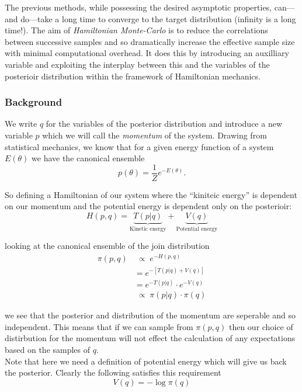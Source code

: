 \documentclass{report}
\begin{document}
The previous methods, while possessing the desired asymptotic properties, can---and do---take a long time to converge to the target distribution (infinity is a long time!). The aim of \emph{Hamiltonian Monte-Carlo} is to reduce the correlations between successive samples and so dramatically increase the effective sample size with minimal computational overhead. It does this by introducing an auxilliary variable and exploiting the interplay between this and the variables of the posterioir distribution within the framework of Hamiltonian mechanics.

\subsubsection{Background}

We write $q$ for the variables of the posterior distribution and introduce a new variable $p$ which we will call the \emph{momentum} of the system. Drawing from statistical mechanics, we know that for a given energy function of a system $E(\theta)$ we have the canonical ensemble
\begin{equation}
  p(\theta) = \frac{1}{Z} e^{-E(\theta)}.
\end{equation}

So defining a Hamiltonian of our system where the ``kiniteic energy'' is dependent on our momentum and the potential energy is dependent only on the posterioir:
\begin{equation}
  H(p, q) = \underbrace{T(p|q)}_{\text{Kinetic energy}} + \underbrace{V(q)}_{\text{Potential energy}}
\end{equation} 

looking at the canonical ensemble of the join distribution
\begin{align}
  \pi(p, q) &\;{\propto} \; e^{-H(p, q)} \\
          &= e^{-[T(p|q) + V(q)]} \\
          &= e^{-T(p|q)} \cdot e^{-V(q)} \\
          &\;{\propto} \; \pi(p|q) \cdot \pi(q) 
\end{align}

we see that the posterior and distribution of the momentum are seperable and so independent. This means that if we can sample from $\pi(p, q)$ then our choice of distirbution for the momentum will not effect the calculation of any expectations based on the samples of $q$. \\

Note that here we need a definition of potential energy which will give us back the posterior. Clearly the following satisfies this requirement
\begin{equation}
  V(q) = - \log \pi(q)
\end{equation}
\end{document}
